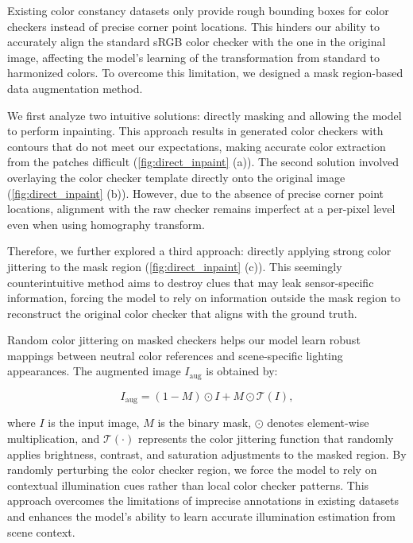 {\vspace{3pt}  
Existing color constancy datasets \cite{Cheng:14,4587765} only provide rough bounding boxes for color checkers instead of precise corner point locations. This hinders our ability to accurately align the standard sRGB color checker with the one in the original image, affecting the model's learning of the transformation from standard to harmonized colors. To overcome this limitation, we designed a mask region-based data augmentation method.

We first analyze two intuitive solutions: directly masking and allowing the model to perform inpainting. This approach results in generated color checkers with contours that do not meet our expectations, making accurate color extraction from the patches difficult (\cref{fig:direct_inpaint} (a)). The second solution involved overlaying the color checker template directly onto the original image (\cref{fig:direct_inpaint} (b)). However, due to the absence of precise corner point locations, alignment with the raw checker remains imperfect at a per-pixel level even when using homography transform.

\vspace{3pt}  
Therefore, we further explored a third approach: directly applying strong color jittering to the mask region (\cref{fig:direct_inpaint} (c)). This seemingly counterintuitive method aims to destroy clues that may leak sensor-specific information, forcing the model to rely on information outside the mask region to reconstruct the original color checker that aligns with the ground truth. 

Random color jittering on masked checkers helps our model learn robust mappings between neutral color references and scene-specific lighting appearances. The augmented image $I_{\text{aug}}$ is obtained by:
\begin{small}
\begin{equation}
I_{\text{aug}} = (1-M) \odot I + M \odot \mathcal{T}(I),
\end{equation}
\end{small}
where $I$ is the input image, $M$ is the binary mask, $\odot$ denotes element-wise multiplication, and $\mathcal{T}(\cdot)$ represents the color jittering function that randomly applies brightness, contrast, and saturation adjustments to the masked region. By randomly perturbing the color checker region, we force the model to rely on contextual illumination cues rather than local color checker patterns. This approach overcomes the limitations of imprecise annotations in existing datasets and enhances the model's ability to learn accurate illumination estimation from scene context.

}
